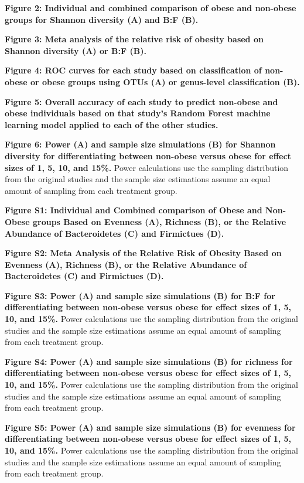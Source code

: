 \documentclass[12pt,]{article}
\begin{document}
\textbf{Figure 2: Individual and combined comparison of obese and
non-obese groups for Shannon diversity (A) and B:F (B).}

\textbf{Figure 3: Meta analysis of the relative risk of obesity based on
Shannon diversity (A) or B:F (B).}

\textbf{Figure 4: ROC curves for each study based on classification of
non-obese or obese groups using OTUs (A) or genus-level classification
(B).}

\textbf{Figure 5: Overall accuracy of each study to predict non-obese
and obese individuals based on that study's Random Forest machine
learning model applied to each of the other studies.}

\textbf{Figure 6: Power (A) and sample size simulations (B) for Shannon
diversity for differentiating between non-obese versus obese for effect
sizes of 1, 5, 10, and 15\%.} Power calculations use the sampling
distribution from the original studies and the sample size estimations
assume an equal amount of sampling from each treatment group.

\newpage

\textbf{Figure S1: Individual and Combined comparison of Obese and
Non-Obese groups Based on Evenness (A), Richness (B), or the Relative
Abundance of Bacteroidetes (C) and Firmictues (D).}

\textbf{Figure S2: Meta Analysis of the Relative Risk of Obesity Based
on Evenness (A), Richness (B), or the Relative Abundance of
Bacteroidetes (C) and Firmictues (D).}

\textbf{Figure S3: Power (A) and sample size simulations (B) for B:F for
differentiating between non-obese versus obese for effect sizes of 1, 5,
10, and 15\%.} Power calculations use the sampling distribution from the
original studies and the sample size estimations assume an equal amount
of sampling from each treatment group.

\textbf{Figure S4: Power (A) and sample size simulations (B) for
richness for differentiating between non-obese versus obese for effect
sizes of 1, 5, 10, and 15\%.} Power calculations use the sampling
distribution from the original studies and the sample size estimations
assume an equal amount of sampling from each treatment group.

\textbf{Figure S5: Power (A) and sample size simulations (B) for
evenness for differentiating between non-obese versus obese for effect
sizes of 1, 5, 10, and 15\%.} Power calculations use the sampling
distribution from the original studies and the sample size estimations
assume an equal amount of sampling from each treatment group.
\end{document}

